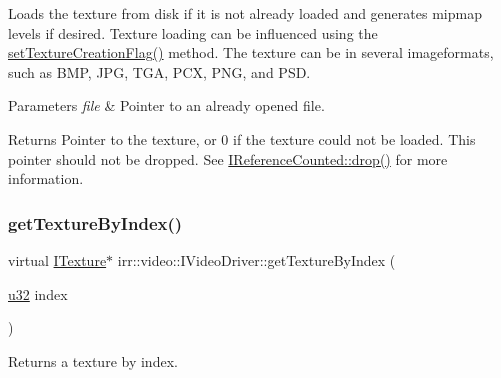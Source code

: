 Loads the texture from disk if it is not already loaded and generates mipmap levels if desired. Texture loading can be influenced using the \hyperlink{classirr_1_1video_1_1IVideoDriver_a868b58a6b86b9e4841ca3879ce246c4e}{set\+Texture\+Creation\+Flag()} method. The texture can be in several imageformats, such as B\+MP, J\+PG, T\+GA, P\+CX, P\+NG, and P\+SD. 
\begin{DoxyParams}{Parameters}
{\em file} & Pointer to an already opened file. \\
\hline
\end{DoxyParams}
\begin{DoxyReturn}{Returns}
Pointer to the texture, or 0 if the texture could not be loaded. This pointer should not be dropped. See \hyperlink{classirr_1_1IReferenceCounted_a03856a09355b89d178090c4a5f738543}{I\+Reference\+Counted\+::drop()} for more information. 
\end{DoxyReturn}
\mbox{\label{classirr_1_1video_1_1IVideoDriver_abfe395b1320ac52cea6be0e912135351}} 
\subsubsection{\texorpdfstring{get\+Texture\+By\+Index()}{getTextureByIndex()}}
{\footnotesize\ttfamily virtual \hyperlink{classirr_1_1video_1_1ITexture}{I\+Texture}$\ast$ irr\+::video\+::\+I\+Video\+Driver\+::get\+Texture\+By\+Index (\begin{DoxyParamCaption}\item[{\hyperlink{namespaceirr_a0416a53257075833e7002efd0a18e804}{u32}}]{index }\end{DoxyParamCaption})\hspace{0.3cm}{\ttfamily [pure virtual]}}



Returns a texture by index. 


